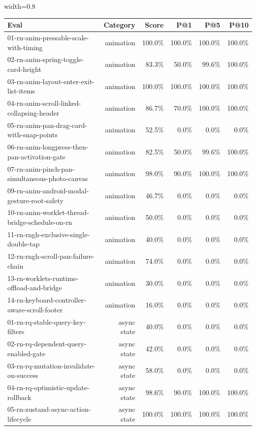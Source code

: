 \begin{table}[htbp]
\centering
\begin{adjustbox}{width=0.8\textwidth}
\begin{tabular}{lrrrrr}
\toprule
Eval & Category & Score & P@1 & P@5 & P@10 \\
\midrule
01-rn-anim-pressable-scale-with-timing & animation & 100.0\% & 100.0\% & 100.0\% & 100.0\% \\
02-rn-anim-spring-toggle-card-height & animation & 83.3\% & 50.0\% & 99.6\% & 100.0\% \\
03-rn-anim-layout-enter-exit-list-items & animation & 100.0\% & 100.0\% & 100.0\% & 100.0\% \\
04-rn-anim-scroll-linked-collapsing-header & animation & 86.7\% & 70.0\% & 100.0\% & 100.0\% \\
05-rn-anim-pan-drag-card-with-snap-points & animation & 52.5\% & 0.0\% & 0.0\% & 0.0\% \\
06-rn-anim-longpress-then-pan-activation-gate & animation & 82.5\% & 50.0\% & 99.6\% & 100.0\% \\
07-rn-anim-pinch-pan-simultaneous-photo-canvas & animation & 98.0\% & 90.0\% & 100.0\% & 100.0\% \\
09-rn-anim-android-modal-gesture-root-safety & animation & 46.7\% & 0.0\% & 0.0\% & 0.0\% \\
10-rn-anim-worklet-thread-bridge-schedule-on-rn & animation & 50.0\% & 0.0\% & 0.0\% & 0.0\% \\
11-rn-rngh-exclusive-single-double-tap & animation & 40.0\% & 0.0\% & 0.0\% & 0.0\% \\
12-rn-rngh-scroll-pan-failure-chain & animation & 74.0\% & 0.0\% & 0.0\% & 0.0\% \\
13-rn-worklets-runtime-offload-and-bridge & animation & 30.0\% & 0.0\% & 0.0\% & 0.0\% \\
14-rn-keyboard-controller-aware-scroll-footer & animation & 16.0\% & 0.0\% & 0.0\% & 0.0\% \\
01-rn-rq-stable-query-key-filters & async state & 40.0\% & 0.0\% & 0.0\% & 0.0\% \\
02-rn-rq-dependent-query-enabled-gate & async state & 42.0\% & 0.0\% & 0.0\% & 0.0\% \\
03-rn-rq-mutation-invalidate-on-success & async state & 58.0\% & 0.0\% & 0.0\% & 0.0\% \\
04-rn-rq-optimistic-update-rollback & async state & 98.6\% & 90.0\% & 100.0\% & 100.0\% \\
05-rn-zustand-async-action-lifecycle & async state & 100.0\% & 100.0\% & 100.0\% & 100.0\% \\

\end{tabular}
\end{adjustbox}
\end{table}
